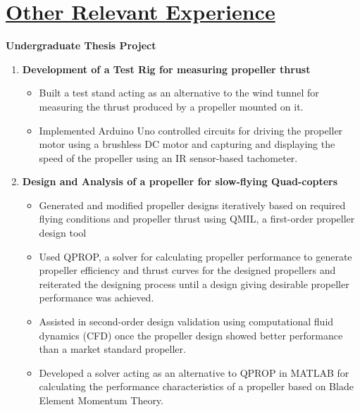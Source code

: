 \section{\underline{Other Relevant Experience}}
\large{\textbf{Undergraduate Thesis Project}}
\hfill
\majordate
\begin{enumerate}
\item\large{\textbf{Development of a Test Rig for measuring propeller thrust}}
\begin{itemize}
\item \large{Built a test stand acting as an alternative to the wind tunnel for measuring the thrust produced by a propeller mounted on it.}
\item\large{Implemented Arduino Uno controlled circuits for driving the propeller motor using a brushless DC motor and capturing and displaying the speed of the propeller using an IR sensor-based tachometer.}
\end{itemize}



\item\large{\textbf{Design and Analysis of a propeller for slow-flying Quad-copters}}
\begin{itemize}
\item\large{Generated and modified propeller designs iteratively based on required flying conditions and propeller thrust using QMIL, a first-order propeller design tool}
\item\large{Used QPROP, a solver for calculating propeller performance to generate propeller efficiency and thrust curves for the designed propellers and reiterated the designing process until a design giving desirable propeller performance was achieved.}
\item\large{Assisted in second-order design validation using computational fluid dynamics (CFD) once the propeller design showed better performance than a market standard propeller.}
\item\large{Developed a solver acting as an alternative to QPROP in MATLAB for calculating the performance characteristics of a propeller based on Blade Element Momentum Theory.}
\end{itemize}
\end{enumerate}
